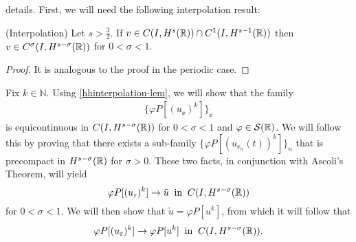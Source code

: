 details. First, we will need the following
interpolation result:
%
%
%
%
\begin{lemma}
\label{hhinterpolation-lem}
(Interpolation)     Let  $s > \frac{3}{2}$.
If $v \in C(I, H^s(\mathbb{R})) \cap C^1(I, H^{s-1}(\mathbb{R}))$
then $v \in C^\sigma (I, H^{s- \sigma}(\mathbb{R}))$ for  $0 < \sigma < 1$.
\end{lemma}
%
\begin{proof} It is analogous to the proof in the periodic case.
\end{proof}
Fix $k \in \mathbb{N}$. Using \cref{hhinterpolation-lem}, we
will show that the family
\begin{equation*}
\begin{split}
\{\varphi P[(u_\ee)^k]\}_\ee
\end{split}
\end{equation*}
is equicontinuous in $C(I, H^{s-\sigma}(\mathbb{R}))$ 
for $0 < \sigma < 1$ and $\varphi \in \mathcal{S}(\mathbb{R})$.
We will follow this by proving that
there exists a sub-family $\{\varphi P[(u_{\ee_n}(t))^k]\}_n$
that is precompact in $H^{s-\sigma}(\mathbb{R})$ for $\sigma > 0$. 
These two facts, in conjunction with Ascoli's Theorem, will
yield
\begin{equation*}
\label{hhstrong-conv2}
\varphi P[(u_\varepsilon)^k] \to \tilde{u}
\; \; \text{in} \; \; C(I,H^{s-\sigma}(\mathbb{R}))
\end{equation*}
for $0 < \sigma < 1$.
We will then show that $\tilde{u} = \varphi P[u^k]$, from which it will
follow that
\begin{equation*}
\label{hhphiplus}
\begin{split}
\varphi P[(u_\varepsilon)^k] \to \varphi P[u^k]
\; \; \text{in} \; \; C(I,H^{s-\sigma}(\mathbb{R})).
\end{split}
\end{equation*}
%
%
%
%
%
